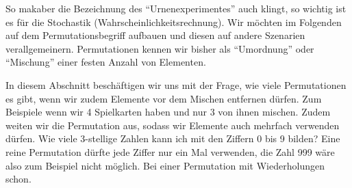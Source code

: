 \documentclass[../../main.tex]{subfiles}
\begin{document}
    So makaber die Bezeichnung des \enquote{Urnenexperimentes} auch klingt, so wichtig ist es für die Stochastik (Wahrscheinlichkeitsrechnung). Wir möchten im Folgenden auf dem Permutationsbegriff aufbauen und diesen auf andere Szenarien verallgemeinern. Permutationen kennen wir bisher als \enquote{Umordnung} oder \enquote{Mischung} einer festen Anzahl von Elementen.
    
    In diesem Abschnitt beschäftigen wir uns mit der Frage, wie viele Permutationen es gibt, wenn wir zudem Elemente vor dem Mischen entfernen dürfen. Zum Beispiele wenn wir 4 Spielkarten haben und nur 3 von ihnen mischen.
    Zudem weiten wir die Permutation aus, sodass wir Elemente auch mehrfach verwenden dürfen. Wie viele 3-stellige Zahlen kann ich mit den Ziffern 0 bis 9 bilden? Eine reine Permutation dürfte jede Ziffer nur ein Mal verwenden, die Zahl 999 wäre also zum Beispiel nicht möglich. Bei einer Permutation mit Wiederholungen schon.
\end{document}
